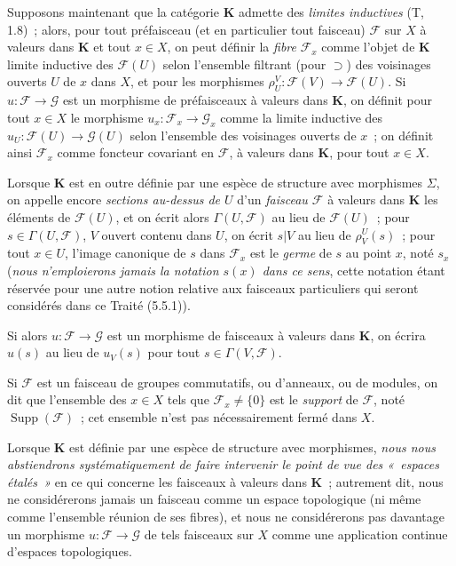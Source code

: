 \begin{env}[3.1.6]
\label{0.3.1.6-fr}
Supposons maintenant que la catégorie $\boldsymbol{K}$ admette des \emph{limites
inductives} (T, 1.8)~; alors, pour tout préfaisceau (et en particulier tout
faisceau) $\mathcal{F}$ sur $X$ à valeurs dans $\boldsymbol{K}$ et tout $x\in X$,
on peut définir la \emph{fibre} $\mathcal{F}_x$ comme l'objet de $\boldsymbol{K}$
limite inductive des $\mathcal{F}(U)$ selon l'ensemble filtrant (pour
$\supset$) des voisinages ouverts $U$ de $x$ dans $X$, et pour les morphismes
$\rho_U^V:\mathcal{F}(V)\to\mathcal{F}(U)$. Si
$u:\mathcal{F}\to\mathcal{G}$ est un morphisme de préfaisceaux à valeurs dans
$\boldsymbol{K}$, on définit pour tout $x\in X$ le morphisme
$u_x:\mathcal{F}_x\to\mathcal{G}_x$ comme la limite inductive des
$u_U:\mathcal{F}(U)\to\mathcal{G}(U)$ selon l'ensemble des voisinages ouverts
de $x$~; on définit ainsi $\mathcal{F}_x$ comme foncteur covariant en
$\mathcal{F}$, à valeurs dans $\boldsymbol{K}$, pour tout $x\in X$.

Lorsque $\boldsymbol{K}$ est en outre définie par une espèce de structure avec
morphismes $\Sigma$, on appelle encore \emph{sections au-dessus de $U$} d'un
\emph{faisceau $\mathcal{F}$} à valeurs dans $\boldsymbol{K}$ les éléments de
$\mathcal{F}(U)$, et on écrit alors $\Gamma(U,\mathcal{F})$ au lieu de
$\mathcal{F}(U)$~; pour $s\in\Gamma(U,\mathcal{F})$, $V$ ouvert contenu dans
$U$, on écrit $s|V$ au lieu de $\rho_V^U(s)$~; pour tout $x\in U$, l'image
canonique de $s$ dans $\mathcal{F}_x$ est le \emph{germe} de $s$ au point $x$,
noté $s_x$ (\emph{nous n'emploierons jamais la notation $s(x)$ dans ce sens},
cette notation étant réservée pour une autre notion relative aux faisceaux
particuliers qui seront considérés dans ce Traité (5.5.1)).

Si alors $u:\mathcal{F}\to\mathcal{G}$ est un morphisme de faisceaux à valeurs
dans $\boldsymbol{K}$, on écrira $u(s)$ au lieu de $u_V(s)$ pour tout
$s\in\Gamma(V,\mathcal{F})$.

Si $\mathcal{F}$ est un faisceau de groupes commutatifs, ou d'anneaux, ou de
modules, on dit que l'ensemble des $x\in X$ tels que
$\mathcal{F}_x\neq\{0\}$ est le \emph{support} de $\mathcal{F}$, noté
$\operatorname{Supp}(\mathcal{F})$~; cet ensemble n'est pas nécessairement
fermé dans $X$.

Lorsque $\boldsymbol{K}$ est définie par une espèce de structure avec morphismes,
\emph{nous nous abstiendrons systématiquement de faire intervenir le point de
vue des «~espaces étalés~»} en ce qui concerne les faisceaux à valeurs dans
$\boldsymbol{K}$~; autrement dit, nous ne considérerons jamais un faisceau comme
un espace topologique (ni même comme l'ensemble réunion de ses fibres), et
nous ne considérerons pas davantage un morphisme
$u:\mathcal{F}\to\mathcal{G}$ de tels faisceaux sur $X$ comme une application
continue d'espaces topologiques.
\end{env}


